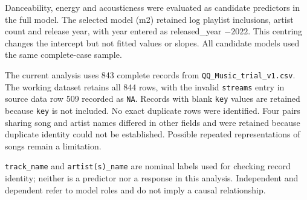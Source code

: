 Danceability, energy and acousticness were evaluated as candidate predictors in the full model. The selected model (m2) retained log playlist inclusions, artist count and release year, with year entered as released\_year $-2022$. This centring changes the intercept but not fitted values or slopes. All candidate models used the same complete-case sample.

The current analysis uses 843 complete records from \texttt{QQ\_Music\_trial\_v1.csv}. The working dataset retains all 844 rows, with the invalid \texttt{streams} entry in source data row 509 recorded as \texttt{NA}. Records with blank \texttt{key} values are retained because \texttt{key} is not included. No exact duplicate rows were identified. Four pairs sharing song and artist names differed in other fields and were retained because duplicate identity could not be established. Possible repeated representations of songs remain a limitation.

\texttt{track\_name} and \texttt{artist(s)\_name} are nominal labels used for checking record identity; neither is a predictor nor a response in this analysis. Independent and dependent refer to model roles and do not imply a causal relationship.

